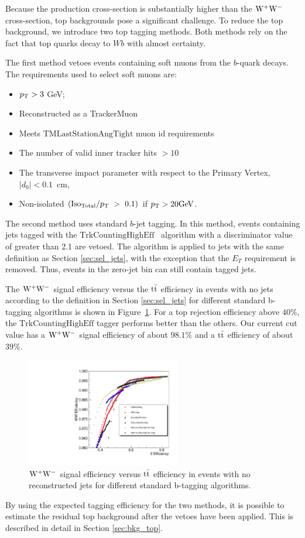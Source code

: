 
Because the production cross-section is substantially higher than the
$\mathrm{W}^+\mathrm{W}^-$ cross-section, top backgrounds pose a significant challenge.
To reduce the top background, we introduce two top tagging methods.
Both methods rely on the fact that top quarks decay to $Wb$ with
almost certainty.

The first method vetoes events
containing soft muons from the $b$-quark decays.
The requirements used to select soft muons are:

\begin{itemize}
    \item $p_\mathrm{T} > 3$ GeV;
    \item Reconstructed as a TrackerMuon
    \item Meets $\mathrm{TMLastStationAngTight}$ muon id requirements
    \item The number of valid inner tracker hits $>10$
    \item The transverse impact parameter with respect to the Primary Vertex, $|d_{0}| < 0.1$~cm,
    \item Non-isolated $({\rm{Iso}_{Total}}/{p_\mathrm{T}}~>~0.1)$ if $p_\mathrm{T}>20\mathrm{Ge\kern -0.1em V}$.
\end{itemize}

The second method uses standard $b$-jet tagging.
In this method, events containing jets tagged with
 the $\mathrm{TrkCountingHighEff}$~\cite{btag} algorithm with
a discriminator value of greater than 2.1 are vetoed.
The algorithm is applied to jets with the same definition as Section \ref{sec:sel_jets},
with the exception that the $E_T$ requirement is removed. 
Thus, events in the zero-jet bin can still contain tagged jets.

The $\mathrm{W}^+\mathrm{W}^-$ signal efficiency versus the $\mathrm{t}\bar{\mathrm{t}}$ efficiency in events with no jets according
to the definition in Section \ref{sec:sel_jets} for different standard b-tagging algorithms 
is shown in Figure~\ref{fig:eff_btag_tt_ww}. 
For a top rejection efficiency above $40\%$,
the $\mathrm{TrkCountingHighEff}$ tagger performs better than the others.
Our current cut value has a $\mathrm{W}^+\mathrm{W}^-$ signal efficiency of about $98.1\%$ and
a $\mathrm{t}\bar{\mathrm{t}}$ efficiency of about $39\%$.

\begin{figure}[!htbp]
\begin{center}
\includegraphics[width=0.60\textwidth]{figures/eff_btag_tt_ww.pdf}
\caption{$\mathrm{W}^+\mathrm{W}^-$ signal efficiency versus $\mathrm{t}\bar{\mathrm{t}}$ efficiency in events with no
reconstructed jets for different standard b-tagging algorithms.}
\label{fig:eff_btag_tt_ww}
\end{center}
\end{figure}

By using the expected tagging efficiency for the two methods,
it is possible to estimate the residual top background after the vetoes
have been applied. This is described in detail in Section \ref{sec:bkg_top}.
